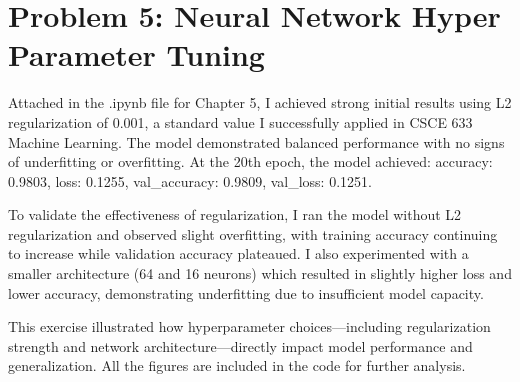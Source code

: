 \documentclass{article}
\begin{document}
\section*{Problem 5: Neural Network Hyper Parameter Tuning}

Attached in the .ipynb file for Chapter 5, I achieved strong initial results using L2 regularization of 0.001, a standard value I successfully applied in CSCE 633 Machine Learning. The model demonstrated balanced performance with no signs of underfitting or overfitting. At the 20th epoch, the model achieved: accuracy: 0.9803, loss: 0.1255, val\_accuracy: 0.9809, val\_loss: 0.1251.

To validate the effectiveness of regularization, I ran the model without L2 regularization and observed slight overfitting, with training accuracy continuing to increase while validation accuracy plateaued. I also experimented with a smaller architecture (64 and 16 neurons) which resulted in slightly higher loss and lower accuracy, demonstrating underfitting due to insufficient model capacity.

This exercise illustrated how hyperparameter choices---including regularization strength and network architecture---directly impact model performance and generalization. All the figures are included in the code for further analysis.
\end{document}
